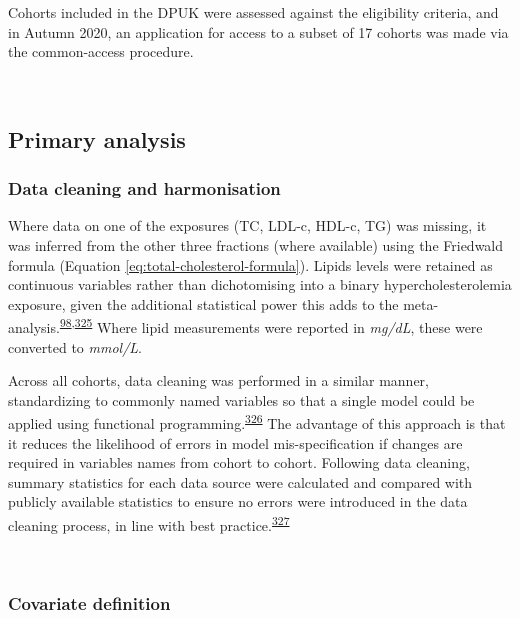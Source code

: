 \documentclass[a4paper, twoside]{templates/ociamthesis}
\begin{document}
Cohorts included in the DPUK were assessed against the eligibility criteria, and in Autumn 2020, an application for access to a subset of 17 cohorts was made via the common-access procedure.

~

\hypertarget{primary-analysis-1}{%
\subsection{Primary analysis}\label{primary-analysis-1}}

\hypertarget{data-cleaning-and-harmonisation}{%
\subsubsection{Data cleaning and harmonisation}\label{data-cleaning-and-harmonisation}}

Where data on one of the exposures (TC, LDL-c, HDL-c, TG) was missing, it was inferred from the other three fractions (where available) using the Friedwald formula (Equation \eqref{eq:total-cholesterol-formula}). Lipids levels were retained as continuous variables rather than dichotomising into a binary hypercholesterolemia exposure, given the additional statistical power this adds to the meta-analysis.\textsuperscript{\protect\hyperlink{ref-riley2020}{98},\protect\hyperlink{ref-ensor2018}{325}} Where lipid measurements were reported in \emph{mg/dL}, these were converted to \emph{mmol/L}.

Across all cohorts, data cleaning was performed in a similar manner, standardizing to commonly named variables so that a single model could be applied using functional programming.\textsuperscript{\protect\hyperlink{ref-wickham2016func}{326}} The advantage of this approach is that it reduces the likelihood of errors in model mis-specification if changes are required in variables names from cohort to cohort. Following data cleaning, summary statistics for each data source were calculated and compared with publicly available statistics to ensure no errors were introduced in the data cleaning process, in line with best practice.\textsuperscript{\protect\hyperlink{ref-levis2021}{327}}

~

\hypertarget{covariate-definition}{%
\subsubsection{Covariate definition}\label{covariate-definition}}
\end{document}
